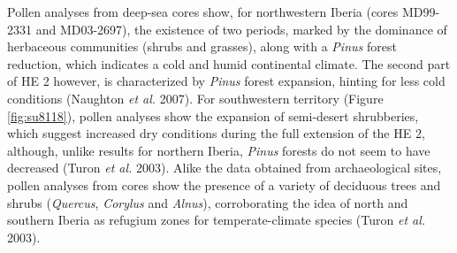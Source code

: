 \documentclass[12pt,twoside]{reedthesis}
\begin{document}
Pollen analyses from deep-sea cores show, for northwestern Iberia (cores MD99-2331 and MD03-2697), the existence of two periods, marked by the dominance of herbaceous communities (shrubs and grasses), along with a \emph{Pinus} forest reduction, which indicates a cold and humid continental climate. The second part of HE 2 however, is characterized by \emph{Pinus} forest expansion, hinting for less cold conditions (Naughton \emph{et al.} 2007). For southwestern territory (Figure \ref{fig:su8118}), pollen analyses show the expansion of semi-desert shrubberies, which suggest increased dry conditions during the full extension of the HE 2, although, unlike results for northern Iberia, \emph{Pinus} forests do not seem to have decreased (Turon \emph{et al.} 2003). Alike the data obtained from archaeological sites, pollen analyses from cores show the presence of a variety of deciduous trees and shrubs (\emph{Quercus}, \emph{Corylus} and \emph{Alnus}), corroborating the idea of north and southern Iberia as refugium zones for temperate-climate species (Turon \emph{et al.} 2003).
\end{document}
